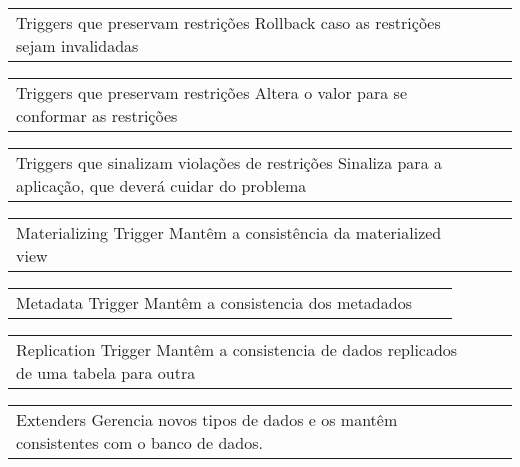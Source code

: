 \documentclass[conference]{IEEEtran}
\begin{document}
    \begin{table}[H]
        \begin{tabular}{p{8cm}p{8cm}p{8cm}}
            \vspace{0pt}
           Triggers que preservam restrições
            \vspace{0pt}
           Rollback caso as restrições sejam invalidadas
        \end{tabular}
        \begin{tabular}{p{8cm}p{8cm}p{8cm}}
            \vspace{0pt}
            Triggers que preservam restrições
            \vspace{0pt}
           Altera o valor para se conformar as restrições
        \end{tabular}
        \begin{tabular}{p{8cm}p{8cm}p{8cm}}
            \vspace{0pt}
            Triggers que sinalizam violações de restrições
            \vspace{0pt}
           Sinaliza para a aplicação, que deverá cuidar do problema
        \end{tabular}
        \begin{tabular}{p{8cm}p{8cm}p{8cm}}
            \vspace{0pt}
            Materializing Trigger
            \vspace{0pt}
           Mantêm a consistência da materialized view
        \end{tabular}
        \begin{tabular}{p{8cm}p{8cm}p{8cm}}
            \vspace{0pt}
           Metadata Trigger
            \vspace{0pt}
           Mantêm a consistencia dos metadados
        \end{tabular}
        \begin{tabular}{p{8cm}p{8cm}p{8cm}}
            \vspace{0pt}
           Replication Trigger
            \vspace{0pt}
           Mantêm a consistencia de dados replicados de uma tabela para outra
        \end{tabular}
        \begin{tabular}{p{8cm}p{8cm}p{8cm}}
            \vspace{0pt}
           Extenders
            \vspace{0pt}
           Gerencia novos tipos de dados e os mantêm consistentes com o banco de dados.

\end{tabular}
\end{table}
\end{document}
